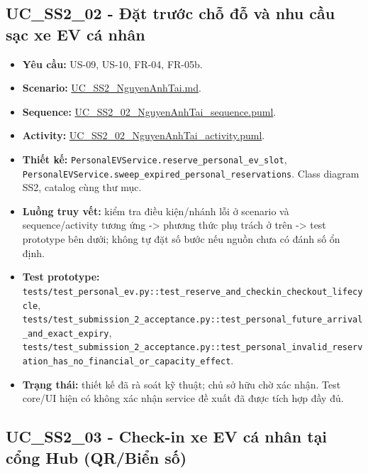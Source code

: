 \documentclass[11pt,a4paper]{article}
\providecommand{\tightlist}{%
  \setlength{\itemsep}{0pt}\setlength{\parskip}{0pt}}
\begin{document}
\hypertarget{uc_ss2_02---ux111ux1eb7t-trux1b0ux1edbc-chux1ed7-ux111ux1ed7-vuxe0-nhu-cux1ea7u-sux1ea1c-xe-ev-cuxe1-nhuxe2n}{%
\subsection{UC\_SS2\_02 - Đặt trước chỗ đỗ và nhu cầu sạc xe EV cá
nhân}\label{uc_ss2_02---ux111ux1eb7t-trux1b0ux1edbc-chux1ed7-ux111ux1ed7-vuxe0-nhu-cux1ea7u-sux1ea1c-xe-ev-cuxe1-nhuxe2n}}

\begin{itemize}
\tightlist
\item
  \textbf{Yêu cầu:} US-09, US-10, FR-04, FR-05b.
\item
  \textbf{Scenario:}
  \href{../../../../docs/diagrams/Use-case\%20detail-scenario/SS2/Usecase\%20scenario/UC_SS2_NguyenAnhTai.md}{UC\_SS2\_NguyenAnhTai.md}.
\item
  \textbf{Sequence:}
  \href{../../../../docs/diagrams/Use-case\%20detail-scenario/SS2/Sequence\%20diagrams/UC_SS2_02_NguyenAnhTai_sequence.puml}{UC\_SS2\_02\_NguyenAnhTai\_sequence.puml}.
\item
  \textbf{Activity:}
  \href{../../../../docs/diagrams/Use-case\%20detail-scenario/SS2/Activity\%20diagrams/UC_SS2_02_NguyenAnhTai_activity.puml}{UC\_SS2\_02\_NguyenAnhTai\_activity.puml}.
\item
  \textbf{Thiết kế:}
  \texttt{PersonalEVService.reserve\_personal\_ev\_slot},
  \texttt{PersonalEVService.sweep\_expired\_personal\_reservations}.
  Class diagram SS2, catalog cùng thư mục.
\item
  \textbf{Luồng truy vết:} kiểm tra điều kiện/nhánh lỗi ở scenario và
  sequence/activity tương ứng -\textgreater{} phương thức phụ trách ở
  trên -\textgreater{} test prototype bên dưới; không tự đặt số bước nếu
  nguồn chưa có đánh số ổn định.
\item
  \textbf{Test prototype:}
  \texttt{tests/test\_personal\_ev.py::test\_reserve\_and\_checkin\_checkout\_lifecycle},
  \texttt{tests/test\_submission\_2\_acceptance.py::test\_personal\_future\_arrival\_and\_exact\_expiry},
  \texttt{tests/test\_submission\_2\_acceptance.py::test\_personal\_invalid\_reservation\_has\_no\_financial\_or\_capacity\_effect}.
\item
  \textbf{Trạng thái:} thiết kế đã rà soát kỹ thuật; chủ sở hữu chờ xác
  nhận. Test core/UI hiện có không xác nhận service đề xuất đã được tích
  hợp đầy đủ.
\end{itemize}

\hypertarget{uc_ss2_03---check-in-xe-ev-cuxe1-nhuxe2n-tux1ea1i-cux1ed5ng-hub-qrbiux1ec3n-sux1ed1}{%
\subsection{UC\_SS2\_03 - Check-in xe EV cá nhân tại cổng Hub (QR/Biển
số)}\label{uc_ss2_03---check-in-xe-ev-cuxe1-nhuxe2n-tux1ea1i-cux1ed5ng-hub-qrbiux1ec3n-sux1ed1}}
\end{document}
